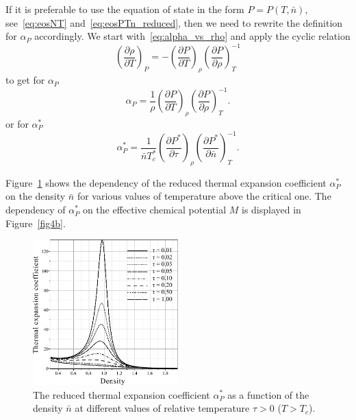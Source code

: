 \documentclass[12pt]{article}
\begin{document}
	If it is preferable to use the equation of state in the form $P=P(T, \bar{n})$, see~\eqref{eq:eosNT} and~\eqref{eq:eosPTn_reduced}, then we need to rewrite the definition for $\alpha_P$ accordingly. We start with~\eqref{eq:alpha_vs_rho} and apply the cyclic relation
	\begin{equation}
		\left(\frac{\partial \rho}{\partial T}\right)_P = - \left(\frac{\partial P}{\partial T}\right)_{\rho} \left(\frac{\partial P}{\partial \rho}\right)^{-1}_T
	\end{equation}
	to get for $\alpha_P$
	\begin{equation}
		\alpha_P = \frac{1}{\rho} \left(\frac{\partial P}{\partial T}\right)_{\rho} \left(\frac{\partial P}{\partial \rho}\right)^{-1}_T.
	\end{equation}
	or for $\alpha^*_P$
	\begin{equation}
		\alpha^*_P = \frac{1}{\bar{n} T^*_c} \left(\frac{\partial P^*}{\partial \tau}\right)_{\rho} \left(\frac{\partial P^*}{\partial \bar{n}}\right)^{-1}_T.
	\end{equation}
	
	Figure~\ref{fig4a} shows the dependency of the reduced thermal expansion coefficient $\alpha^*_P$ on the density $\bar{n}$ for various values of temperature above the critical one. The dependency of $\alpha^*_P$ on the effective chemical potential $M$ is displayed in Figure~\ref{fig4b}.
	
	\begin{figure}[h!]
		\centering \includegraphics[width=0.5\textwidth]{f4a.pdf}
		\vskip-3mm\caption{The reduced thermal expansion coefficient $\alpha^*_P$ as a function of the density $\bar n$ at different values of relative temperature $\tau > 0$ ($T > T_c$). 
		}\label{fig4a}
	\end{figure}
	
\end{document}
